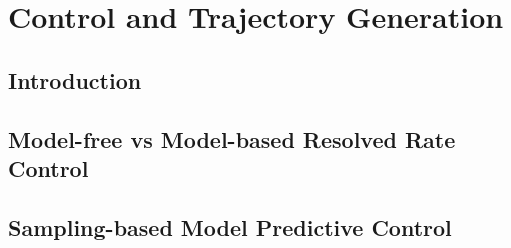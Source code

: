 \chapter{Control and Trajectory Generation} \label{chap:chap-5}

\section{Introduction}
\label{sec:chap_5_introduction}

\section{Model-free vs Model-based Resolved Rate Control}
\label{sec:resolved_rate_control}

\section{Sampling-based Model Predictive Control}
\label{sec:model_prective_control}



